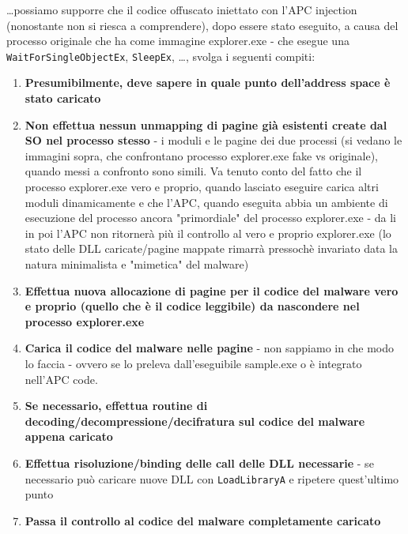 \documentclass[
    a4paper, %
    11pt %
]{article}
\begin{document}
            \dots possiamo supporre che il codice offuscato iniettato con l'APC injection (nonostante non si riesca a 
            comprendere), dopo essere stato eseguito, a causa del processo originale che ha come immagine explorer.exe - che esegue una 
            \texttt{WaitForSingleObjectEx}, \texttt{SleepEx}, \dots, svolga i seguenti compiti:

            \begin{enumerate}
                \item \textbf{Presumibilmente, deve sapere in quale punto dell'address space è stato caricato}
                \item \textbf{Non effettua nessun unmapping di pagine già esistenti create dal SO nel processo stesso} -
                    i moduli e le pagine dei due processi (si vedano le immagini sopra, che confrontano processo explorer.exe fake vs originale), quando messi a confronto sono simili. Va tenuto conto
                    del fatto che il processo explorer.exe vero e proprio, quando lasciato eseguire carica altri
                    moduli dinamicamente e che l'APC, quando eseguita abbia un ambiente di esecuzione del processo ancora
                    "primordiale" del processo explorer.exe - da li in poi l'APC non ritornerà più il controllo
                    al vero e proprio explorer.exe (lo stato delle DLL caricate/pagine mappate rimarrà pressochè invariato data la natura minimalista e "mimetica" del malware)
                \item \textbf{Effettua nuova allocazione di pagine per il codice del malware vero e proprio (quello che è il codice leggibile) da nascondere
                    nel processo explorer.exe}
                \item \textbf{Carica il codice del malware nelle pagine} - non sappiamo in che modo lo faccia -
                    ovvero se lo preleva dall'eseguibile sample.exe o è integrato nell'APC code.
                \item \textbf{Se necessario, effettua routine di decoding/decompressione/decifratura sul codice del malware appena caricato}
                \item \textbf{Effettua risoluzione/binding delle call delle DLL necessarie} - se necessario può caricare
                    nuove DLL con \texttt{LoadLibraryA} e ripetere quest'ultimo punto
                \item \textbf{Passa il controllo al codice del malware completamente caricato}
            \end{enumerate}
\end{document}
